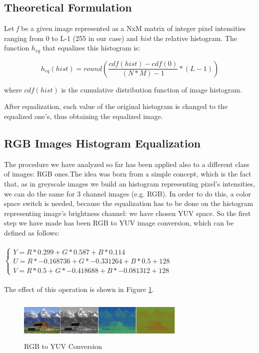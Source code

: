 \documentclass[10pt,twocolumn,letterpaper]{article}
\begin{document}
\subsection{Theoretical Formulation}
Let \textit{f} be a given image represented as a NxM matrix of integer pixel intensities ranging from 0 to L-1 (255 in our case) and \textit{hist} the relative histogram.
The function ${h_{eq}}$ that equalizes this histogram is:

\begin{equation}
	h_{eq}(hist) =  round(\frac{cdf(hist) - cdf(0)}{(N * M) - 1} * (L - 1))
	\label{equalization}
\end{equation}

where ${cdf(hist)}$ is the cumulative distribution function of image histogram.

After equalization, each value of the original histogram is changed to the equalized one's, thus obtaining the equalized image.

\subsection{RGB Images Histogram Equalization}
The procedure we have analyzed so far has been applied also to a different class of images: RGB ones.The idea was born from a simple concept, which is the fact that, as in greyscale images we build an histogram representing pixel's intensities, we can do the same for 3 channel images (e.g. RGB). In order to do this, a color space switch is needed, because the equalization has to be done on the histogram representing image's brightness channel: we have chosen YUV space. So the first step we have made has been RGB to YUV image conversion, which can be defined as follows: \\
\\
	$\begin{cases} 
	Y = R * 0.299 + G * 0.587 + B * 0.114 \\
	U = R * -0.168736 + G * -0.331264 + B * 0.5 + 128 \\
	V = R * 0.5 + G * -0.418688 + B * -0.081312 + 128
	\end{cases}$\\
\\
The effect of this operation is shown in Figure \ref{fig:YUV}.

\begin{figure}[h]
	\centering
	\includegraphics[width=8cm, height=2cm]{YUV}
	\caption{RGB to YUV Conversion}
	\label{fig:YUV}
\end{figure}
\end{document}

